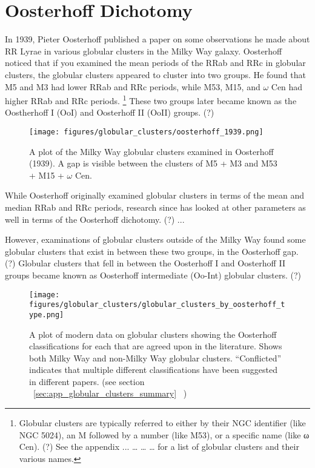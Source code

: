 \documentclass[]{article}
\begin{document}
\newpage

\section{Oosterhoff Dichotomy}

In 1939, Pieter Oosterhoff published a paper on some observations he made about RR Lyrae in various globular clusters in the Milky Way galaxy. Oosterhoff noticed that if you examined the mean periods of the RRab and RRc in globular clusters, the globular clusters appeared to cluster into two groups. He found that M5 and M3 had lower RRab and RRc periods, while M53, M15, and $\omega$ Cen had higher RRab and RRc periods. \footnote{Globular clusters are typically referred to either by their NGC identifier (like NGC 5024), an M followed by a number (like M53), or a specific name (like ω Cen). (?) See the appendix ... … … … for a list of globular clusters and their various names.} \cite{oosterhoff_1939} These two groups later became known as the Oostherhoff I (OoI) and Oosterhoff II (OoII) groups. (?)

\begin{figure}
	\centering
	\texttt{[image: figures/globular\_clusters/oosterhoff\_1939.png]}
	\caption{A plot of the Milky Way globular clusters examined in Oosterhoff (1939). \cite{oosterhoff_1939} A gap is visible between the clusters of M5 + M3 and M53 + M15 + $\omega$ Cen.}
	\label{fig:oosterhoff_1939_globular_clusters}
\end{figure}

While Oosterhoff originally examined globular clusters in terms of the mean and median RRab and RRc periods, research since has looked at other parameters as well in terms of the Oosterhoff dichotomy. (?) ...

However, examinations of globular clusters outside of the Milky Way found some globular clusters that exist in between these two groups, in the Oosterhoff gap. (?) Globular clusters that fell in between the Oosterhoff I and Oosterhoff II groups became known as Oosterhoff intermediate (Oo-Int) globular clusters. (?)

\begin{figure}
	\centering
	\texttt{[image: figures/globular\_clusters/globular\_clusters\_by\_oosterhoff\_type.png]}
	\caption{A plot of modern data on globular clusters showing the Oosterhoff classifications for each that are agreed upon in the literature. Shows both Milky Way and non-Milky Way globular clusters. ``Conflicted'' indicates that multiple different classifications have been suggested in different papers. (see section ~\ref{sec:app_globular_clusters_summary}~ )}
	\label{fig:modern_globular_clusters}
\end{figure}
\end{document}
